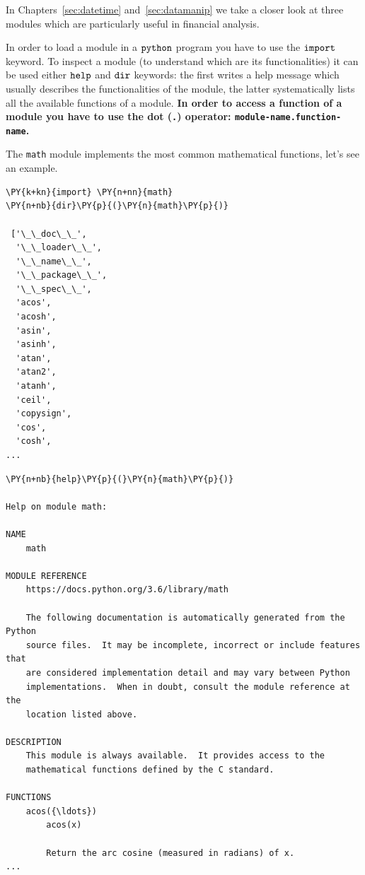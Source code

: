 In Chapters~\ref{sec:datetime} and~\ref{sec:datamanip} we take a closer look at three modules which are particularly 
useful in financial analysis.

In order to load a module in a \(\tt{python}\) program you have to use the \(\tt{import}\) keyword. 
To inspect a module (to understand which are its functionalities) it can be used either 
\(\tt{help}\) and \(\tt{dir}\) keywords: the first writes a help message which usually describes 
the functionalities of the module, the latter systematically lists all the available functions of a module.
\textbf{In order to access a function of a module you have to use the dot (\texttt{.}) operator: 
\texttt{module-name.function-name}.}

The \texttt{math} module implements the most common mathematical functions, let's see an example. 

\begin{codebox}[breakable, size=fbox, boxrule=1pt, pad at break*=1mm, colback=cellbackground, colframe=cellborder]            
\begin{Verbatim}[commandchars=\\\{\}]
\PY{k+kn}{import} \PY{n+nn}{math}
\PY{n+nb}{dir}\PY{p}{(}\PY{n}{math}\PY{p}{)}

 ['\_\_doc\_\_',
  '\_\_loader\_\_',
  '\_\_name\_\_',
  '\_\_package\_\_',
  '\_\_spec\_\_',
  'acos',
  'acosh',
  'asin',
  'asinh',
  'atan',
  'atan2',
  'atanh',
  'ceil',
  'copysign',
  'cos',
  'cosh',
...
\end{Verbatim}
\end{codebox}

\begin{codebox}[breakable, size=fbox, boxrule=1pt, pad at break*=1mm, colback=cellbackground, colframe=cellborder]            
\begin{Verbatim}[commandchars=\\\{\}]
\PY{n+nb}{help}\PY{p}{(}\PY{n}{math}\PY{p}{)}

Help on module math:

NAME
    math

MODULE REFERENCE
    https://docs.python.org/3.6/library/math

    The following documentation is automatically generated from the Python
    source files.  It may be incomplete, incorrect or include features that
    are considered implementation detail and may vary between Python
    implementations.  When in doubt, consult the module reference at the
    location listed above.

DESCRIPTION
    This module is always available.  It provides access to the
    mathematical functions defined by the C standard.

FUNCTIONS
    acos({\ldots})
        acos(x)

        Return the arc cosine (measured in radians) of x.
...
\end{Verbatim}
\end{codebox}

